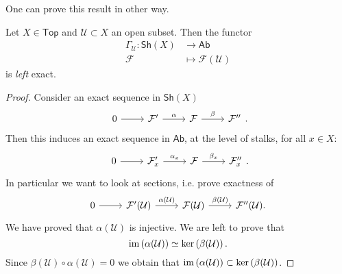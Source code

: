 \documentclass[../Main]{subfiles}
\begin{document}
\begin{rem}[]
	One can prove this result in other way.
\end{rem}

\begin{prop}[]
	Let $X \in \mathsf{Top}$ and $\mathcal{U} \subset X$ an open subset.
	Then the functor
	\begin{align}
		\Gamma_{\mathcal{U}}\colon \mathsf{Sh}\left(X\right) &\longrightarrow \mathsf{Ab} \\
		\mathcal{F} &\longmapsto \mathcal{F}(\mathcal{U}) \nonumber
	\end{align} 
	is {\em left} exact.
\end{prop}
\begin{proof}
	Consider an exact sequence in $\mathsf{Sh}\left(X\right)$
	\begin{equation}
	\begin{tikzcd}
		0 \arrow[r, "", rightarrow] &
		\mathcal{F}' \arrow[r, "\alpha", rightarrow] &
		\mathcal{F} \arrow[r, "\beta", rightarrow] &
		\mathcal{F}''
	\end{tikzcd}
	.\end{equation} 
	Then this induces an exact sequence in $\mathsf{Ab}$, at the level of stalks, for
	all $x \in X$:
	\begin{equation}
	\begin{tikzcd}
		0 \arrow[r, "", rightarrow] &
		\mathcal{F}'_x \arrow[r, "\alpha_x", rightarrow] &
		\mathcal{F} \arrow[r, "\beta_x", rightarrow] &
		\mathcal{F}''_x
	\end{tikzcd}
	.\end{equation} 
	In particular we want to look at sections, i.e. prove exactness of
	\begin{equation}
	\begin{tikzcd}
		0 \arrow[r, "", rightarrow] &
		\mathcal{F}'(\mathcal{U}) \arrow[r, "\alpha(\mathcal{U})", rightarrow] &
		\mathcal{F}(\mathcal{U}) \arrow[r, "\beta(\mathcal{U})", rightarrow] &
		\mathcal{F}''(\mathcal{U})
	.\end{tikzcd}
	\end{equation} 
	We have proved that $\alpha(\mathcal{U})$ is injective.
	We are left to prove that
	\begin{equation}
		\operatorname{im} \left( \alpha(\mathcal{U}) \right) \simeq
		\ker \left( \beta(\mathcal{U}) \right)
	.\end{equation} 
	Since $\beta(\mathcal{U}) \circ \alpha(\mathcal{U}) = 0$ we obtain
	that $\operatorname{im} \left( \alpha(\mathcal{U}) \right) \subset \ker \left( \beta(\mathcal{U}) \right)$.

\end{proof}
\end{document}
